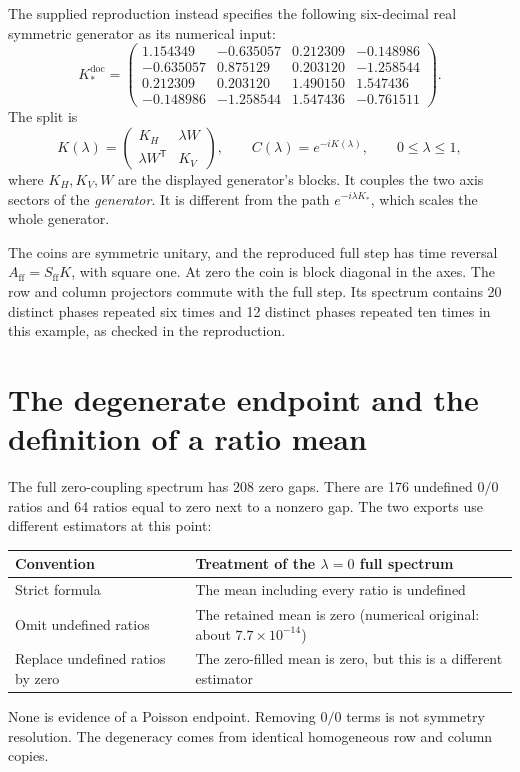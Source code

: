 \documentclass[11pt,a4paper,oneside]{report}
\numberwithin{equation}{chapter}
\begin{document}
The supplied reproduction instead specifies the following
six-decimal real symmetric generator as its numerical input:
\begin{equation}
K_*^{\mathrm{doc}}=
\begin{pmatrix}
1.154349&-0.635057&0.212309&-0.148986\\
-0.635057&0.875129&0.203120&-1.258544\\
0.212309&0.203120&1.490150&1.547436\\
-0.148986&-1.258544&1.547436&-0.761511
\end{pmatrix}.
\end{equation}
The split is
\begin{equation}
K(\lambda)=
\begin{pmatrix}K_H&\lambda W\\\lambda W^{\mathsf T}&K_V\end{pmatrix},
\qquad C(\lambda)=e^{-iK(\lambda)},\qquad0\leq\lambda\leq1,
\end{equation}
where \(K_H,K_V,W\) are the displayed generator's blocks. It
couples the two axis sectors of the \emph{generator}. It is different
from the path \(e^{-i\lambda K_*}\), which scales the whole generator.

The coins are symmetric unitary, and the reproduced full step has
time reversal \(A_{\mathrm{ff}}=S_{\mathrm{ff}}K\), with square one.
At zero the coin is block diagonal in the axes. The row and column
projectors commute with the full step. Its spectrum contains 20
distinct phases repeated six times and 12 distinct phases repeated
ten times in this example, as checked in the reproduction.

\section{The degenerate endpoint and the definition of a ratio mean}

The full zero-coupling spectrum has 208 zero gaps. There are 176
undefined \(0/0\) ratios and 64 ratios equal to zero next to a
nonzero gap. The two exports use different estimators at this point:
\begin{center}
\small
\begin{tabularx}{\textwidth}{@{}lY@{}}
\toprule
Convention&Treatment of the \(\lambda=0\) full spectrum\\
\midrule
Strict formula&The mean including every ratio is undefined\\
Omit undefined ratios&The retained mean is zero (numerical original: about \(7.7\times10^{-14}\))\\
Replace undefined ratios by zero&The zero-filled mean is zero, but this is a different estimator\\
\bottomrule
\end{tabularx}
\end{center}
None is evidence of a Poisson endpoint. Removing \(0/0\) terms is
not symmetry resolution. The degeneracy comes from identical
homogeneous row and column copies.
\end{document}
